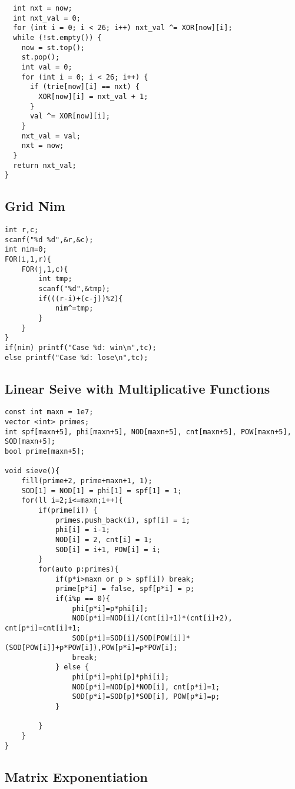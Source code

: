 \documentclass[10pt,a4paper,onesided]{article}
\begin{document}
\begin{multicols*}{3}
\begin{lstlisting}
  int nxt = now;
  int nxt_val = 0;
  for (int i = 0; i < 26; i++) nxt_val ^= XOR[now][i];
  while (!st.empty()) {
    now = st.top();
    st.pop();
    int val = 0;
    for (int i = 0; i < 26; i++) {
      if (trie[now][i] == nxt) {
        XOR[now][i] = nxt_val + 1;
      }
      val ^= XOR[now][i];
    }
    nxt_val = val;
    nxt = now;
  }
  return nxt_val;
}
\end{lstlisting}
\subsection{Grid Nim}
\begin{lstlisting}
int r,c;
scanf("%d %d",&r,&c);
int nim=0;
FOR(i,1,r){
    FOR(j,1,c){
        int tmp;
        scanf("%d",&tmp);
        if(((r-i)+(c-j))%2){
            nim^=tmp;
        }
    }
}
if(nim) printf("Case %d: win\n",tc);
else printf("Case %d: lose\n",tc);
\end{lstlisting}
\subsection{Linear Seive with Multiplicative Functions}
\begin{lstlisting}
const int maxn = 1e7;
vector <int> primes;
int spf[maxn+5], phi[maxn+5], NOD[maxn+5], cnt[maxn+5], POW[maxn+5], SOD[maxn+5]; 
bool prime[maxn+5];

void sieve(){
    fill(prime+2, prime+maxn+1, 1);
    SOD[1] = NOD[1] = phi[1] = spf[1] = 1;
    for(ll i=2;i<=maxn;i++){
        if(prime[i]) {
            primes.push_back(i), spf[i] = i;
            phi[i] = i-1;
            NOD[i] = 2, cnt[i] = 1;
            SOD[i] = i+1, POW[i] = i;
        }
        for(auto p:primes){
            if(p*i>maxn or p > spf[i]) break;
            prime[p*i] = false, spf[p*i] = p;
            if(i%p == 0){
                phi[p*i]=p*phi[i];
                NOD[p*i]=NOD[i]/(cnt[i]+1)*(cnt[i]+2), cnt[p*i]=cnt[i]+1;
                SOD[p*i]=SOD[i]/SOD[POW[i]]*(SOD[POW[i]]+p*POW[i]),POW[p*i]=p*POW[i];
                break;
            } else {
                phi[p*i]=phi[p]*phi[i];
                NOD[p*i]=NOD[p]*NOD[i], cnt[p*i]=1;
                SOD[p*i]=SOD[p]*SOD[i], POW[p*i]=p;
            }

        }
    }
}\end{lstlisting}
\subsection{Matrix Exponentiation}
\begin{lstlisting}


\end{lstlisting}
\end{multicols*}
\end{document}
